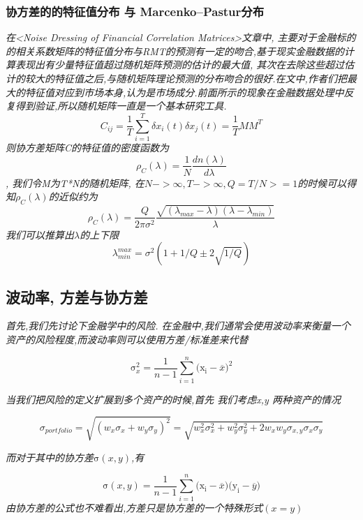 \documentclass{scrartcl}
\numberwithin{equation}{section}   %
\begin{document}
\subsubsection{协方差的的特征值分布 与 Marcenko–Pastur分布}
\textsl{在<Noise Dressing of Financial Correlation Matrices>文章中, 主要对于金融标的的相关系数矩阵的特征值分布与RMT的预测有一定的吻合,基于现实金融数据的计算表现出有少量特征值超过随机矩阵预测的估计的最大值, 其次在去除这些超过估计的较大的特征值之后,与随机矩阵理论预测的分布吻合的很好.在文中,作者们把最大的特征值对应到市场本身,认为是市场成分.前面所示的现象在金融数据处理中反复得到验证,所以随机矩阵一直是一个基本研究工具. $$C_{ij} = \frac{1}{T}\sum_{i=1}^T \delta x_i(t) \delta x_j (t) = \frac{1}{T} M M^T$$ 则协方差矩阵C的特征值的密度函数为$$\rho_{C}(\lambda) =  \frac{1}{N} \frac{dn(\lambda)}{d\lambda}$$, 我们令M为T*N的随机矩阵, 在$N -> \infty, T-> \infty, Q= T/N >=1 $的时候可以得知$\rho_{C}(\lambda)$的近似约为$$\rho_{C}(\lambda) = \frac{Q}{2\pi \sigma^2} \frac{\sqrt{(\lambda_{max} - \lambda)(\lambda - \lambda_{min})}}{\lambda}$$我们可以推算出$\lambda$的上下限$$\lambda_{min}^{max} = \sigma^2 (1+ 1/Q \pm 2\sqrt{1/Q})$$}
\subsection{波动率, 方差与协方差}
\indent \textsl{首先,我们先讨论下金融学中的风险. 在金融中,我们通常会使用波动率来衡量一个资产的风险程度,而波动率则可以使用方差/标准差来代替}

\begin{equation}
    \mathrm{\sigma}^2_x=  \frac{1}{n - 1} \sum^n_{i=1} {(\mathrm{x_i}  - \overline{x}})^2
\end{equation}


\indent \textsl{当我们把风险的定义扩展到多个资产的时候,首先 我们考虑x,y 两种资产的情况 }


\begin{equation}
    \sigma_{portfolio}= \sqrt{(w_x\sigma_x + w_y\sigma_y)^2} = \sqrt{w_x^2\sigma_x^2 + w_y^2\sigma_y^2 + 2 w_x w_y\sigma_{x,y} \sigma_x \sigma_y}
\end{equation}


\indent \textsl{而对于其中的协方差$\mathrm{\sigma}(x,y)$,有}

\begin{equation}
    \mathrm{\sigma}(x,y)=  \frac{1}{n - 1} \sum^n_{i=1} {(\mathrm{x_i}  - \overline{x}}) {(\mathrm{y_i}  - \overline{y}})
\end{equation}
\textsl{由协方差的公式也不难看出,方差只是协方差的一个特殊形式$(x=y)$}
\end{document}

